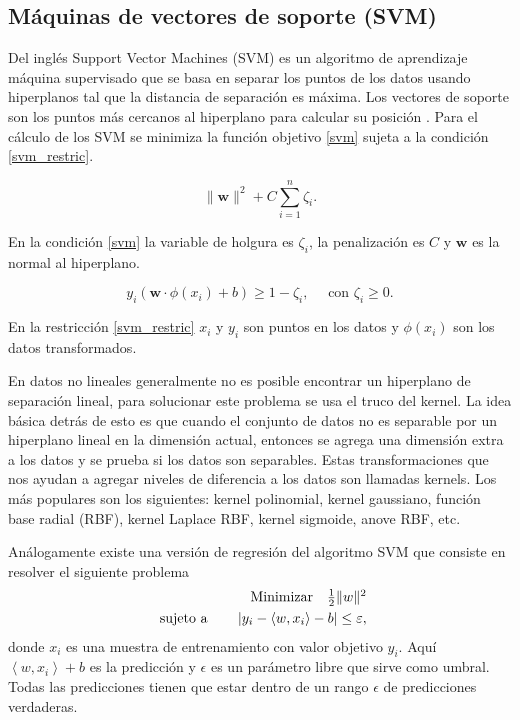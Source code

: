 \subsection{Máquinas de vectores de soporte (SVM)}

Del inglés Support Vector Machines (SVM) es un algoritmo de aprendizaje máquina supervisado que se basa en separar los puntos de los datos usando hiperplanos tal que la distancia de separación es máxima. Los vectores de soporte son los puntos más cercanos al hiperplano para calcular su posición \parencite{mudassirTimeseriesForecastingBitcoin2020}.
Para el cálculo de los SVM se minimiza la función objetivo \ref{svm} sujeta a la condición \ref{svm_restric}.

\begin{equation}
	\|\mathbf{w}\|^{2}+C \sum_{i=1}^{n} \zeta_{i}.
	\label{svm}
\end{equation}

En la condición \ref{svm} la variable de holgura es $\zeta_{i}$, la penalización es $C$ y $\mathbf{w}$ es la normal al hiperplano.

\begin{equation}
	y_{i}\left(\mathbf{w} \cdot \phi\left(x_{i}\right)+b \right) \geq 1-\zeta_{i}, \quad \text { con } \zeta_{i} \geq 0.
	\label{svm_restric}
\end{equation}

En la restricción \ref{svm_restric} $x_i$ y $y_i$ son puntos en los datos y $\phi(x_i)$ son los datos transformados. 

En datos no lineales generalmente no es posible encontrar un hiperplano de separación lineal, para solucionar este problema se usa el truco del kernel. La idea básica detrás de esto es que cuando el conjunto de datos no es separable por un hiperplano lineal en la dimensión actual, entonces se agrega una dimensión extra a los datos y se prueba si los datos son separables.
Estas transformaciones que nos ayudan a agregar niveles de diferencia a los datos son llamadas kernels. Los más populares son los siguientes: kernel polinomial, kernel gaussiano, función base radial (RBF), kernel Laplace RBF, kernel sigmoide, anove RBF, etc.  

Análogamente existe una versión de regresión del algoritmo SVM que consiste en resolver el siguiente problema
\[
\begin{array}{r@{}r@{}r@{}l}
	\text{Minimizar} \quad \frac{1}{2}\|w\|^{2} \\[\jot]
	\text{sujeto a}\qquad \left|y_{i}-\left\langle w, x_{i}\right\rangle-b\right| \leq \varepsilon, \\
	
\end{array}
\]
donde $x_i$ es una muestra de entrenamiento con valor objetivo $y_i$. Aquí $\left\langle w, x_{i}\right\rangle+b$ es la predicción y $\epsilon$ es un parámetro libre que sirve como umbral. Todas las predicciones tienen que estar dentro de un rango $\epsilon$ de predicciones verdaderas. 

